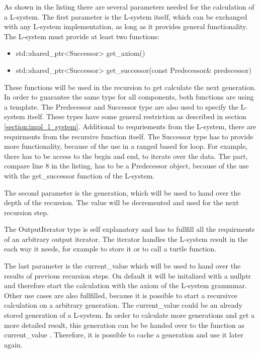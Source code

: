 \documentclass[english]{cpp-hmwk}
\begin{document}
\noindent As shown in the listing there are several parameters needed for the calculation of a  L-system. The first parameter is the L-system itself, which can be exchanged with any L-system implementation, as long as it provides general functionality. The L-system must provide at least two functions:

\begin{itemize}
\item std::shared\_ptr<Successor> get\_axiom()
\item std::shared\_ptr<Successor> get\_successor(const Predecessor\& predecessor)
\end{itemize}

\noindent These functions will be used in the recursion to get calculate the next generation. In order to guarantee the same type for all components, both functions are using a template. The Predecessor and Successor type are also used to specify the L-system itself. These types have some general restriction as described in section \ref{section:impl_l_system}.\newline
Additional to requriements from the L-system, there are requirments from the recursive function itself.  The Successor type has to provide more functionality, because of the use in a ranged based for loop. For example, there has to be access to the begin and end, to iterate over the data. The part, compare line 8 in the listing, has to be a Predecessor object, because of the use with the get\_successor function of the L-system.

The second parameter is the generation, which will be used to hand over the depth of the recursion. The value will be decremented and used for the next recursion step.

The OutputIterator type is self explanatory and has to fullfill all the requirments of an arbitrary output iterator. The iterator handles the L-system result in the each way it needs, for example to store it or to call a turtle function.

The last parameter is the current\_value which will be used to hand over the results of previous recursion steps. On default it will be initalized with a nullptr and therefore start the calculation with the axiom of the L-system grammmar. Other use cases are also fullfilled, because it is possible to start a recursivce calculation on a arbitrary generation. The current\_value could be an already stored generation of a L-system. In order to calculate more generations and get a more detailed result, this generation can be be handed over to the function as current\_value . Therefore, it is possible to cache a generation and use it later again.
\end{document}
